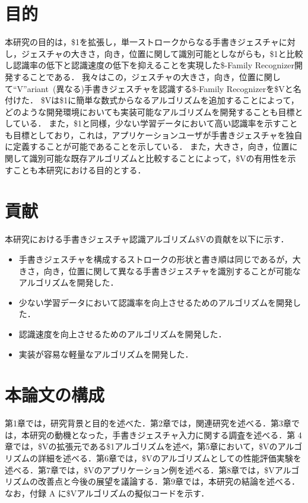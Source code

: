 \section{目的}
本研究の目的は，\$1を拡張し，単一ストロークからなる手書きジェスチャに対し，ジェスチャの大きさ，向き，位置に関して識別可能としながらも，\$1と比較し認識率の低下と認識速度の低下を抑えることを実現した\$-Family Recognizer開発することである．
我々はこの，ジェスチャの大きさ，向き，位置に関して``V''ariant~(異なる)手書きジェスチャを認識する\$-Family Recognizerを\$Vと名付けた．
\$Vは\$1に簡単な数式からなるアルゴリズムを追加することによって，どのような開発環境においても実装可能なアルゴリズムを開発することも目標としている．
また，\$1と同様，少ない学習データにおいて高い認識率を示すことも目標としており，これは，アプリケーションユーザが手書きジェスチャを独自に定義することが可能であることを示している．
また，大きさ，向き，位置に関して識別可能な既存アルゴリズムと比較することによって，\$Vの有用性を示すことも本研究における目的とする．



\section{貢献}
本研究における手書きジェスチャ認識アルゴリズム\$Vの貢献を以下に示す．
\begin{itemize}
\item 手書きジェスチャを構成するストロークの形状と書き順は同じであるが，大きさ，向き，位置に関して異なる手書きジェスチャを識別することが可能なアルゴリズムを開発した．
\item 少ない学習データにおいて認識率を向上させるためのアルゴリズムを開発した．
\item 認識速度を向上させるためのアルゴリズムを開発した．
\item 実装が容易な軽量なアルゴリズムを開発した．
\end{itemize}

\section{本論文の構成}
第1章では，研究背景と目的を述べた．第2章では，関連研究を述べる．第3章では，本研究の動機となった，手書きジェスチャ入力に関する調査を述べる．第 4 章では，\$Vの拡張元である\$1アルゴリズムを述べ，第5章において，\$Vのアルゴリズムの詳細を述べる．第6章では，\$Vのアルゴリズムとしての性能評価実験を述べる．第7章では，\$Vのアプリケーション例を述べる．第8章では，\$Vアルゴリズムの改善点と今後の展望を議論する．第9章では，本研究の結論を述べる．
なお，付録 A に\$Vアルゴリズムの擬似コードを示す．
